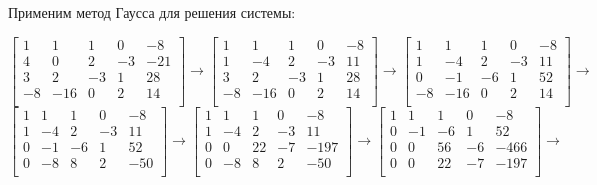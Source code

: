 \documentclass[a4paper]{article}
\begin{document}
Применим метод Гаусса для решения системы: \par
\[
\left[
\begin{array}{cccc|c}
	1 & 1 & 1 & 0 & -8 \\
	4 & 0 & 2 & -3 & -21 \\
	3 & 2 & -3 & 1 & 28 \\
	-8 & -16 & 0 & 2 & 14 \\
\end{array}
\right]
\to
\left[
\begin{array}{cccc|c}
	1 & 1 & 1 & 0 & -8 \\
	1 & -4 & 2 & -3 & 11 \\
	3 & 2 & -3 & 1 & 28 \\
	-8 & -16 & 0 & 2 & 14 \\	
\end{array}
\right]
\to
\left[
\begin{array}{cccc|c}
	1 & 1 & 1 & 0 & -8 \\
	1 & -4 & 2 & -3 & 11 \\
	0 & -1 & -6 & 1 & 52 \\
	-8 & -16 & 0 & 2 & 14 \\		
\end{array}
\right]
\to\]
\[
\left[
\begin{array}{cccc|c}
	1 & 1 & 1 & 0 & -8 \\
	1 & -4 & 2 & -3 & 11 \\
	0 & -1 & -6 & 1 & 52 \\
	0 & -8 & 8 & 2 & -50 \\			
\end{array}
\right]
\to
\left[
\begin{array}{cccc|c}
	1 & 1 & 1 & 0 & -8 \\
	1 & -4 & 2 & -3 & 11 \\
	0 & 0 & 22 & -7 & -197 \\
	0 & -8 & 8 & 2 & -50 \\			
\end{array}
\right]
\to
\left[
\begin{array}{cccc|c}
	1 & 1 & 1 & 0 & -8 \\
	0 & -1 & -6 & 1 & 52 \\
	0 & 0 & 56 & -6 & -466 \\
	0 & 0 & 22 & -7 & -197 \\		
\end{array}
\right]
\to\]
\end{document}
